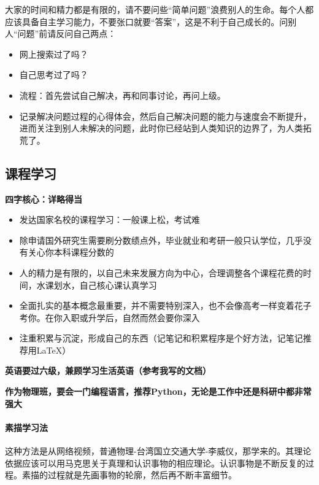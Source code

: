 \documentclass[cn,hazy,blue,14pt,screen]{elegantnote}
\begin{document}
大家的时间和精力都是有限的，请不要问些“简单问题”浪费别人的生命。每个人都应该具备自主学习能力，不要张口就要“答案”，这是不利于自己成长的。问别人“问题”前请反问自己两点：
\begin{itemize}
\item 网上搜索过了吗？
\item 自己思考过了吗？
\item 流程：首先尝试自己解决，再和同事讨论，再问上级。
\item 记录解决问题过程的心得体会，然后自己解决问题的能力与速度会不断提升，进而关注到别人未解决的问题，此时你已经站到人类知识的边界了，为人类拓荒了。
\end{itemize}

 
 

\newpage
\subsection{课程学习}
{ \bf 四字核心：详略得当}
\begin{itemize}
\item 发达国家名校的课程学习：一般课上松，考试难

\item 除申请国外研究生需要刷分数绩点外，毕业就业和考研一般只认学位，几乎没有关心你本科课程分数的

\item 人的精力是有限的，以自己未来发展方向为中心，合理调整各个课程花费的时间，水课划水，自己核心课认真学习

\item 全面扎实的基本概念最重要，并不需要特别深入，也不会像高考一样变着花子考你。在你入职或升学后，自然而然会要你深入

\item 注重积累与沉淀，形成自己的东西（记笔记和积累程序是个好方法，记笔记推荐用\LaTeX ）
\end{itemize}


{\bf 英语要过六级，兼顾学习生活英语（参考我写的文档）}


{\bf 作为物理班，要会一门编程语言，推荐Python，无论是工作中还是科研中都非常强大}


\newpage
\paragraph{素描学习法}
这种方法是从网络视频，普通物理-台湾国立交通大学-李威仪，那学来的。其理论依据应该可以用马克思关于真理和认识事物的相应理论。认识事物是不断反复的过程。素描的过程就是先画事物的轮廓，然后再不断丰富细节。
\end{document}

